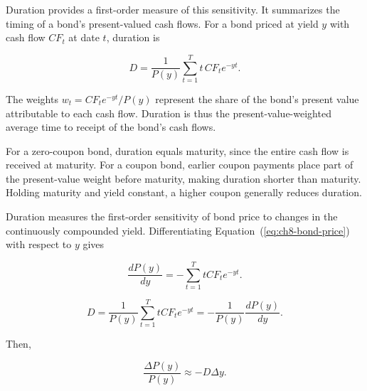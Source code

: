 Duration provides a first-order measure of this sensitivity. It summarizes the timing of a bond's present-valued cash flows. For a bond priced at yield $y$ with cash flow $CF_t$ at date $t$, duration is

\begin{equation}
D=\frac{1}{P(y)}
\sum_{t=1}^{T}
t\,CF_t e^{-yt}.
\label{eq:ch8-macaulay-duration}
\end{equation}

The weights $w_t = CF_t e^{-yt}/P(y)$ represent the share of the bond's present value attributable to each cash flow. Duration is thus the present-value-weighted average time to receipt of the bond's cash flows.

For a zero-coupon bond,  duration equals maturity, since the entire cash flow is received at maturity. For a coupon bond, earlier coupon payments place part of the present-value weight before maturity, making duration shorter than maturity. Holding maturity and yield constant, a higher coupon generally reduces duration.

Duration measures the first-order sensitivity of bond price to changes in the continuously compounded yield. Differentiating Equation~(\ref{eq:ch8-bond-price}) with respect to $y$ gives

\begin{equation}
\frac{dP(y)}{dy}=-\sum_{t=1}^{T}
tCF_t e^{-yt}.
\label{eq:ch8-price-yield-derivative}
\end{equation}

\begin{equation}
D=
\frac{1}{P(y)}
\sum_{t=1}^{T}
tCF_t e^{-yt}
=
-\frac{1}{P(y)}
\frac{dP(y)}{dy}
.
\label{eq:ch8-duration}
\end{equation}

Then, 

\begin{equation}
\frac{\Delta P(y)}{P(y)}
\approx
-D \Delta y.
\label{eq:ch8-duration-price-change}
\end{equation}

